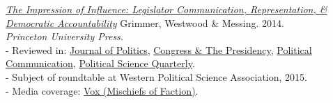 \documentclass[letterpaper,11pt]{article}
\newcommand{\resheading}[1]{\vspace{4pt}{\large
\colorbox{mygrey}{\begin{minipage}{\textwidth}{\textbf{#1
\vphantom{p\^{E}}}}\end{minipage}}}\vspace{4pt}}
\begin{document}
\resheading{Books}
\begin{description}

\item[] \href{http://stanford.edu/~jgrimmer/BookProsp.pdf}{\emph{The Impression of Influence: Legislator Communication, Representation, \& Democratic Accountability}} Grimmer, Westwood \& Messing. 2014. \emph{Princeton University Press.}  \\ 
- Reviewed in: \href{http://www.jstor.org/stable/10.1086/681889}{Journal of Politics}, \href{http://www.tandfonline.com/doi/abs/10.1080/07343469.2015.1034616}{Congress \& The Presidency}, \href{http://www.tandfonline.com/doi/abs/10.1080/10584609.2015.1083820}{Political Communication}, \href{http://onlinelibrary.wiley.com/doi/10.1002/polq.12415/abstract}{Political Science Quarterly}. \\
- Subject of roundtable at Western Political Science Association, 2015.\\
- Media coverage: \href{https://web.archive.org/web/20150121013710/http://www.mischiefsoffaction.com:80/2015/01/its-frequency-not-size-compromise.html}{Vox (Mischiefs of Faction)}.


\end{description}
\end{document}
